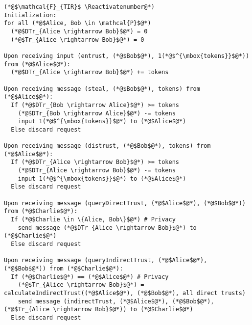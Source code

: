 \Suppressnumber
\begin{lstlisting}[label=tirfunc, style=numbers]
(*@$\mathcal{F}_{TIR}$ \Reactivatenumber@*)
Initialization:
for all (*@$Alice, Bob \in \mathcal{P}$@*)
  (*@$DTr_{Alice \rightarrow Bob}$@*) = 0
  (*@$Tr_{Alice \rightarrow Bob}$@*) = 0

Upon receiving input (entrust, (*@$Bob$@*), 1(*@$^{\mbox{tokens}}$@*)) from (*@$Alice$@*):
  (*@$DTr_{Alice \rightarrow Bob}$@*) += tokens

Upon receiving message (steal, (*@$Bob$@*), tokens) from (*@$Alice$@*):
  If (*@$DTr_{Bob \rightarrow Alice}$@*) >= tokens
    (*@$DTr_{Bob \rightarrow Alice}$@*) -= tokens
    input 1(*@$^{\mbox{tokens}}$@*) to (*@$Alice$@*)
  Else discard request

Upon receiving message (distrust, (*@$Bob$@*), tokens) from (*@$Alice$@*):
  If (*@$DTr_{Alice \rightarrow Bob}$@*) >= tokens
    (*@$DTr_{Alice \rightarrow Bob}$@*) -= tokens
    input 1(*@$^{\mbox{tokens}}$@*) to (*@$Alice$@*)
  Else discard request

Upon receiving message (queryDirectTrust, (*@$Alice$@*), (*@$Bob$@*)) from (*@$Charlie$@*):
  If (*@$Charlie \in \{Alice, Bob\}$@*) # Privacy
    send message (*@$DTr_{Alice \rightarrow Bob}$@*) to (*@$Charlie$@*)
  Else discard request

Upon receiving message (queryIndirectTrust, (*@$Alice$@*), (*@$Bob$@*)) from (*@$Charlie$@*):
  If (*@$Charlie$@*) == (*@$Alice$@*) # Privacy
    (*@$Tr_{Alice \rightarrow Bob}$@*) = calculateIndirectTrust((*@$Alice$@*), (*@$Bob$@*), all direct trusts)
    send message (indirectTrust, (*@$Alice$@*), (*@$Bob$@*), (*@$Tr_{Alice \rightarrow Bob}$@*)) to (*@$Charlie$@*)
  Else discard request
\end{lstlisting}
